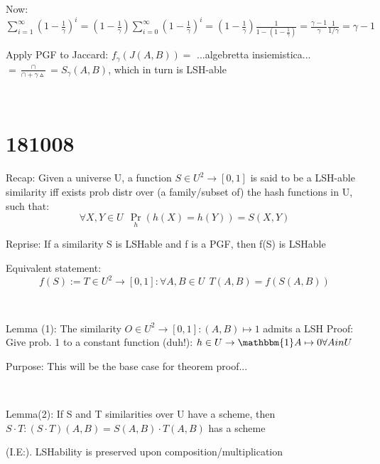 \documentclass{report}
\begin{document}
	Now: $\displaystyle \sum_{i=1}^{\infty}(1 - \frac{1}{\gamma})^i = (1 - \frac{1}{\gamma})\sum_{i=0}^{\infty}(1 - \frac{1}{\gamma})^i = (1 - \frac{1}{\gamma}) \frac{1}{1 - (1 - \frac{1}{\gamma})} = \frac{\gamma -1 }{\gamma}\frac{1}{1/\gamma} = \gamma -1$
	
	
	Apply PGF to Jaccard: $f_\gamma (J(A, B)) = $ ...algebretta insiemistica... $= \frac{\cap}{\cap + \gamma\vartriangle} = S_\gamma(A, B)$, which in turn is LSH-able
	
	
	\
	
	\section{181008}
	
	
	
	Recap: Given a universe U, a function $S \in U^2 \to [0, 1]$ is said to be a LSH-able similarity iff exists prob distr over (a family/subset of) the hash functions in U, such that: 
	\begin{equation}
	\forall X, Y \in U\ \ \Pr_h(h(X)=h(Y)) = S(X, Y)
	\end{equation}
	
	
	Reprise: If a similarity S is LSHable and f is a PGF, then f(S) is LSHable
	
	Equivalent statement:
	\begin{equation}
	f(S) := T \in U^2 \to [0, 1] : \forall A, B \in U\ \ T(A, B) = f(S(A, B))
	\end{equation}
	
	
	
	
	\
	
	Lemma (1): The similarity $O \in U^2 \to [0, 1] : (A, B) \mapsto 1$ admits a LSH
	Proof: Give prob. 1 to a constant function (duh!): $h \in U \to \mathbbm{1} A \mapsto 0 \forall A in U$
	
	Purpose: This will be the base case for theorem proof...
	
	
	\
	
	Lemma(2): If S and T similarities over U have a scheme, then $S \cdot T : (S \cdot T)(A, B) = S(A, B)\cdot T(A, B)$ has a scheme
	
	(I.E:). LSHability is preserved upon composition/multiplication
	
\end{document}
